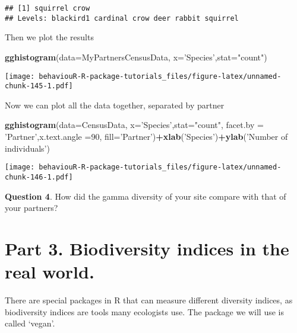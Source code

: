 \documentclass[]{book}
\newenvironment{Shaded}{\begin{snugshade}}{\end{snugshade}}
\newcommand{\DataTypeTok}[1]{\textcolor[rgb]{0.13,0.29,0.53}{#1}}
\newcommand{\DecValTok}[1]{\textcolor[rgb]{0.00,0.00,0.81}{#1}}
\newcommand{\KeywordTok}[1]{\textcolor[rgb]{0.13,0.29,0.53}{\textbf{#1}}}
\newcommand{\NormalTok}[1]{#1}
\newcommand{\OperatorTok}[1]{\textcolor[rgb]{0.81,0.36,0.00}{\textbf{#1}}}
\newcommand{\StringTok}[1]{\textcolor[rgb]{0.31,0.60,0.02}{#1}}
\begin{document}
\begin{verbatim}
## [1] squirrel crow    
## Levels: blackird1 cardinal crow deer rabbit squirrel
\end{verbatim}

Then we plot the results

\begin{Shaded}
\begin{Highlighting}[]
\KeywordTok{gghistogram}\NormalTok{(}\DataTypeTok{data=}\NormalTok{MyPartnersCensusData, }\DataTypeTok{x=}\StringTok{'Species'}\NormalTok{,}\DataTypeTok{stat=}\StringTok{"count"}\NormalTok{)}
\end{Highlighting}
\end{Shaded}

\texttt{[image: behaviouR-R-package-tutorials\_files/figure-latex/unnamed-chunk-145-1.pdf]}

Now we can plot all the data together, separated by partner

\begin{Shaded}
\begin{Highlighting}[]
\KeywordTok{gghistogram}\NormalTok{(}\DataTypeTok{data=}\NormalTok{CensusData, }\DataTypeTok{x=}\StringTok{'Species'}\NormalTok{,}\DataTypeTok{stat=}\StringTok{"count"}\NormalTok{,}
            \DataTypeTok{facet.by =} \StringTok{'Partner'}\NormalTok{,}\DataTypeTok{x.text.angle =}\DecValTok{90}\NormalTok{,}
            \DataTypeTok{fill=}\StringTok{'Partner'}\NormalTok{)}\OperatorTok{+}\KeywordTok{xlab}\NormalTok{(}\StringTok{'Species'}\NormalTok{)}\OperatorTok{+}\KeywordTok{ylab}\NormalTok{(}\StringTok{'Number of individuals'}\NormalTok{)}
\end{Highlighting}
\end{Shaded}

\texttt{[image: behaviouR-R-package-tutorials\_files/figure-latex/unnamed-chunk-146-1.pdf]}

\textbf{Question 4}. How did the gamma diversity of your site compare with that of your partners?

\hypertarget{part-3.-biodiversity-indices-in-the-real-world.}{%
\section*{Part 3. Biodiversity indices in the real world.}\label{part-3.-biodiversity-indices-in-the-real-world.}}

There are special packages in R that can measure different diversity indices, as biodiversity indices are tools many ecologists use. The package we will use is called `vegan'.
\end{document}
